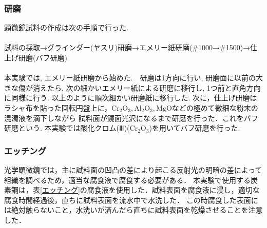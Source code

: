 \documentclass[a4paper,11pt,uplatex]{jsarticle}
\begin{document}
\subsubsection{研磨}
顕微鏡試料の作成は次の手順で行った.
\\ \\
試料の採取→グラインダー(ヤスリ)研磨→エメリー紙研磨(\#1000→\#1500)→仕上げ研磨(バフ研磨)
\\ \\
本実験では, エメリー紙研磨から始めた.　研磨は1方向に行い, 研磨面に以前の大きな傷が消えたら,
次の細かいエメリー紙による研磨に移行し, 1つ前と直角方向に同様に行う. 以上のように順次細かい研磨紙に移行した.
次に，仕上げ研磨はラシャ布を貼った回転円盤上に，$\mathrm{Cr_2O_3,Al_2O_3,MgO}$などの極めて微細な粉末の混濁液を滴下しながら
試料面が鏡面光沢になるまで研磨を行った．これをバフ研磨という. 本実験では酸化クロム(Ⅲ)($\mathrm{Cr_2O_3}$)を用いてバフ研磨を行った.

\subsubsection{エッチング}
光学顕微鏡では，主に試料面の凹凸の差により起こる反射光の明暗の差によって組織を調べるため，適当な腐食液で腐食する必要がある．
本実験で使用する炭素鋼は，表\ref{エッチング}の腐食液を使用した．試料表面を腐食液に浸し，適切な腐食時間経過後，直ちに試料表面を流水中で水洗した．
この時腐食した表面には絶対触らないこと，水洗いが済んだら直ちに試料表面を乾燥させることを注意した．
\end{document}
